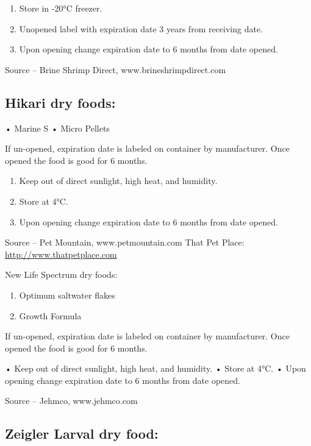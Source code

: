 \documentclass[
]{book}
\providecommand{\tightlist}{%
  \setlength{\itemsep}{0pt}\setlength{\parskip}{0pt}}
\begin{document}
\begin{enumerate}
\def\labelenumi{\arabic{enumi}.}
\tightlist
\item
  Store in -20°C freezer.
\item
  Unopened label with expiration date 3 years from receiving date.
\item
  Upon opening change expiration date to 6 months from date opened.
\end{enumerate}

Source -- Brine Shrimp Direct, www.brineshrimpdirect.com

\hypertarget{hikari-dry-foods}{%
\subsection{Hikari dry foods:}\label{hikari-dry-foods}}

• Marine S
• Micro Pellets

If un-opened, expiration date is labeled on container by manufacturer. Once opened the food is good for 6 months.

\begin{enumerate}
\def\labelenumi{\arabic{enumi}.}
\tightlist
\item
  Keep out of direct sunlight, high heat, and humidity.
\item
  Store at 4°C.
\item
  Upon opening change expiration date to 6 months from date opened.
\end{enumerate}

Source -- Pet Mountain, www.petmountain.com
That Pet Place: \url{http://www.thatpetplace.com}

New Life Spectrum dry foods:

\begin{enumerate}
\def\labelenumi{\arabic{enumi}.}
\setcounter{enumi}{1}
\tightlist
\item
  Optimum saltwater flakes
\item
  Growth Formula
\end{enumerate}

If un-opened, expiration date is labeled on container by manufacturer. Once opened the food is good for 6 months.

• Keep out of direct sunlight, high heat, and humidity.
• Store at 4°C.
• Upon opening change expiration date to 6 months from date opened.

Source -- Jehmco, www.jehmco.com

\hypertarget{zeigler-larval-dry-food}{%
\subsection{Zeigler Larval dry food:}\label{zeigler-larval-dry-food}}
\end{document}
